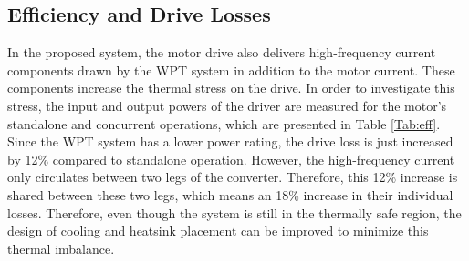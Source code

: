 \documentclass[journal]{IEEEtran}
\begin{document}
\subsection{Efficiency and Drive Losses}
In the proposed system, the motor drive also delivers high-frequency current components drawn by the WPT system in addition to the motor current. These components increase the thermal stress on the drive.
In order to investigate this stress, the input and output powers of the driver are measured for the motor's standalone and concurrent operations, which are presented in Table \ref{Tab:eff}. 
Since the WPT system has a lower power rating, the drive loss is just increased by 12\% compared to standalone operation. 
However, the high-frequency current only circulates between two legs of the converter. Therefore, this 12\% increase is shared between these two legs, which means an 18\% increase in their individual losses. 
Therefore, even though the system is still in the thermally safe region, the design of cooling and heatsink placement can be improved to  minimize this thermal imbalance.
\vspace*{-2mm}
\end{document}
